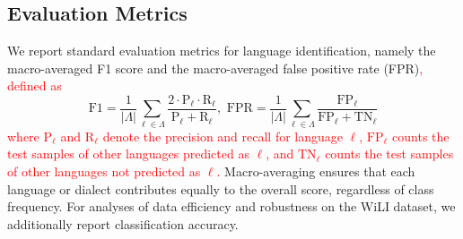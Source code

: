 \documentclass{article}
\newcommand{\camrev}[1]{\textcolor{red}{#1}}
\newcommand{\lang}{\ell}
\newcommand{\languages}{\Lambda}
\begin{document}



\subsection{Evaluation Metrics}


We report standard evaluation metrics for language identification, namely the macro-averaged F1 score and the macro-averaged false positive rate (FPR)\camrev{, defined as}
{\color{red}\begin{equation}
    \mathrm{F1} = \frac{1}{|\languages|} \sum_{\lang \in \languages} \frac{2 \cdot \mathrm{P}_{\lang} \cdot \mathrm{R}_{\lang}}{\mathrm{P}_{\lang} + \mathrm{R}_{\lang}},\,\, \mathrm{FPR} = \frac{1}{|\languages|} \sum_{\lang \in \languages} \frac{\mathrm{FP}_{\lang}}{\mathrm{FP}_{\lang} + \mathrm{TN}_{\lang}}
\end{equation}}%
\camrev{where $\mathrm{P}_{\lang}$ and $\mathrm{R}_{\lang}$ denote the precision and recall for language $\lang$, $\mathrm{FP}_{\lang}$ counts the test samples of other languages predicted as $\lang$, and $\mathrm{TN}_{\lang}$ counts the test samples of other languages not predicted as $\lang$.} Macro-averaging ensures that each language or dialect contributes equally to the overall score, regardless of class frequency. For analyses of data efficiency and robustness on the WiLI dataset, we additionally report classification accuracy.
\end{document}
